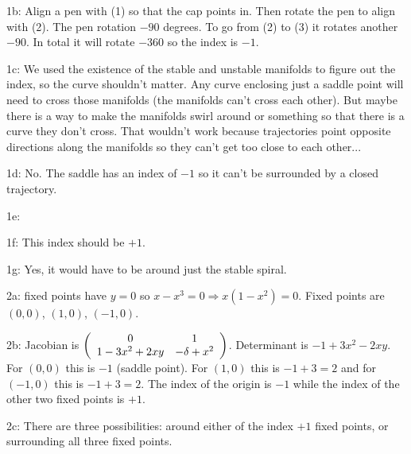 \documentclass[12pt,letterpaper,noanswers]{exam}
\begin{document}
1b: Align a pen with (1) so that the cap points in.  Then rotate the pen to align with (2).  The pen rotation $-90$ degrees.  To go from (2) to (3) it rotates another $-90$.  In total it will rotate $-360$ so the index is $-1$.

1c: We used the existence of the stable and unstable manifolds to figure out the index, so the curve shouldn't matter.  Any curve enclosing just a saddle point will need to cross those manifolds (the manifolds can't cross each other).  But maybe there is a way to make the manifolds swirl around or something so that there is a curve they don't cross.  That wouldn't work because trajectories point opposite directions along the manifolds so they can't get too close to each other... 

1d: No.  The saddle has an index of $-1$ so it can't be surrounded by a closed trajectory.

1e: 

1f: This index should be $+1$.

1g: Yes, it would have to be around just the stable spiral.

2a: fixed points have $y = 0$ so $x-x^3 = 0 \Rightarrow x(1-x^2) = 0$. Fixed points are $(0,0)$, $(1,0)$, $(-1,0)$.

2b: Jacobian is $\left(\begin{array}{c c}0 & 1 \\ 1-3x^2+2xy & -\delta + x^2\end{array}\right)$.  Determinant is $-1+3x^2-2xy$.  For $(0,0)$ this is $-1$ (saddle point).  For $(1,0)$ this is $-1+3 = 2$ and for $(-1,0)$ this is $-1+3=2$.  The index of the origin is $-1$ while the index of the other two fixed points is $+1$.

2c: There are three possibilities: around either of the index $+1$ fixed points, or surrounding all three fixed points.
\end{document}
